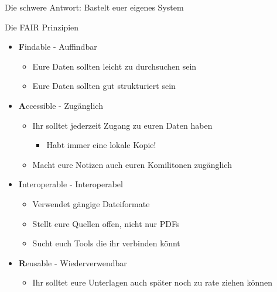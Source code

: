 \documentclass[aspectratio=169,shownotes]{beamer}
\begin{document}
\begin{frame}{Die schwere Antwort: Bastelt euer eigenes System}
\pause
\begin{block}{Die FAIR Prinzipien}
    \begin{itemize}
        \setlength{\itemindent}{-2em}
        \item[] \textbf{F}indable - Auffindbar
        \begin{itemize}
            \item Eure Daten sollten leicht zu durchsuchen sein
            \item Eure Daten sollten gut strukturiert sein
        \end{itemize}
        \item[] \textbf{A}ccessible - Zugänglich
        \begin{itemize}
            \item Ihr solltet jederzeit Zugang zu euren Daten haben
            \begin{itemize}
                \item Habt immer eine lokale Kopie!
            \end{itemize}
        \item Macht eure Notizen auch euren Komilitonen zugänglich
    \end{itemize}
        \item[] \textbf{I}nteroperable - Interoperabel
        \begin{itemize}
            \item Verwendet gängige Dateiformate
            \item Stellt eure Quellen offen, nicht nur PDFs
            \item Sucht euch Tools die ihr verbinden könnt
        \end{itemize}
        \item[] \textbf{R}eusable - Wiederverwendbar
        \begin{itemize}
            \item Ihr solltet eure Unterlagen auch später noch zu rate ziehen können
        \end{itemize}
    \end{itemize}
\end{block}
\end{frame}
\end{document}
